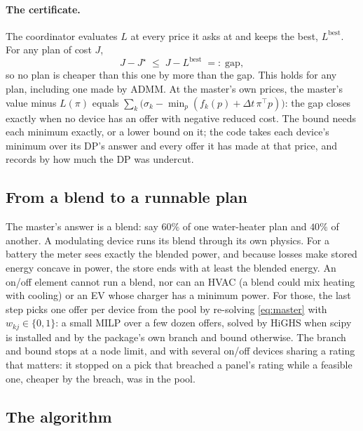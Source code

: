 \documentclass[11pt,a4paper]{article}
\newcommand{\dt}{\Delta t}
\begin{document}
\paragraph{The certificate.} The coordinator evaluates $L$ at every price it
asks at and keeps the best, $L^{\mathrm{best}}$. For any plan of cost $J$,
\[
  J - J^\star \;\le\; J - L^{\mathrm{best}} \;=:\; \text{gap},
\]
so no plan is cheaper than this one by more than the gap. This holds for any plan,
including one made by ADMM. At the master's own prices, the master's value minus
$L(\pi)$ equals $\sum_k \big(\sigma_k - \min_p (f_k(p) + \dt\,\pi^{\!\top} p)\big)$:
the gap closes exactly when no device has an offer with negative reduced cost.
The bound needs each minimum exactly, or a lower bound on it; the code takes each
device's minimum over its DP's answer and every offer it has made at that price,
and records by how much the DP was undercut.

\subsection{From a blend to a runnable plan}
\label{sec:recover}

The master's answer is a blend: say $60\%$ of one water-heater plan and $40\%$
of another. A modulating device runs its blend through its own physics. For a
battery the meter sees exactly the blended power, and because losses make stored
energy concave in power, the store ends with at least the blended energy. An
on/off element cannot run a blend, nor can an HVAC (a blend could mix heating
with cooling) or an EV whose charger has a minimum power. For those, the last
step picks one offer per device from the pool by re-solving \eqref{eq:master}
with $w_{kj} \in \{0,1\}$: a small MILP over a few dozen offers, solved by
HiGHS when scipy is installed and by the package's own branch and bound
otherwise. The branch and bound stops at a node limit, and with several on/off
devices sharing a rating that matters: it stopped on a pick that breached a
panel's rating while a feasible one, cheaper by the breach, was in the pool.

\subsection{The algorithm}
\end{document}
